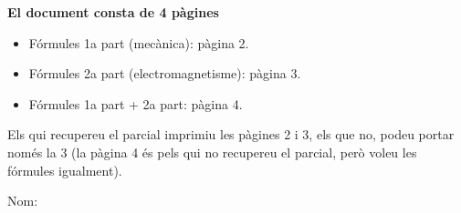 \documentclass[12pt,a4paper]{article}
\begin{document}
\vspace*{\fill}
\begin{center}
     \Huge {\bf El document consta de 4 pàgines}
\end{center}

\quad

{\Large 
    \begin{addmargin}[10em]{0em}
        \begin{itemize}
            \item Fórmules 1a part (mecànica): pàgina 2.
            \item Fórmules 2a part (electromagnetisme): pàgina 3.
            \item Fórmules 1a part + 2a part: pàgina 4.
        \end{itemize}
    \end{addmargin}
    
    \quad
    
    \begin{addmargin}[8em]{8em}
    Els qui recupereu el parcial imprimiu les pàgines 2 i 3, els que no, podeu portar només la 3 (la pàgina 4 és pels qui no recupereu el parcial, però voleu les fórmules igualment).
    
    \end{addmargin}
}
\vspace*{\fill}

\newpage

\raggedright
\begin{multicols}{4}
{\fontsize{12}{12}\selectfont
}
\newpage
\end{multicols}

\begin{multicols}{3}


\vspace{15pt}
\raggedleft
{\Large Nom: \underline{\hspace{6cm}}}
\end{multicols}


\end{document}
